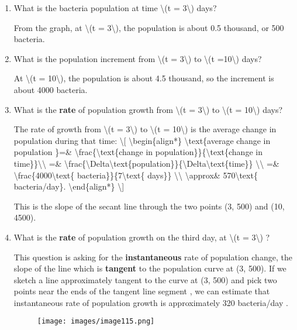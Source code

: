 \begin{enumerate}
\item
  What is the bacteria population at time \textbackslash{}(t =
  3\textbackslash{}) days?

  From the graph, at \textbackslash{}(t = 3\textbackslash{}), the
  population is about 0.5 thousand, or 500 bacteria.
\item
  What is the population increment from \textbackslash{}(t =
  3\textbackslash{}) to \textbackslash{}(t =10\textbackslash{}) days?

  At \textbackslash{}(t = 10\textbackslash{}), the population is about
  4.5 thousand, so the increment is about 4000 bacteria.
\item
  What is the \textbf{rate} of population growth from \textbackslash{}(t
  = 3\textbackslash{}) to \textbackslash{}(t = 10\textbackslash{}) days?

  The rate of growth from \textbackslash{}(t = 3\textbackslash{}) to
  \textbackslash{}(t = 10\textbackslash{}) is the average change in
  population during that time: \textbackslash{}{[}
  \textbackslash{}begin\{align*\} \textbackslash{}text\{average change
  in population \}=\& \textbackslash{}frac\{\textbackslash{}text\{change
  in population\}\}\{\textbackslash{}text\{change in
  time\}\}\textbackslash{}\textbackslash{} =\&
  \textbackslash{}frac\{\textbackslash{}Delta\textbackslash{}text\{population\}\}\{\textbackslash{}Delta\textbackslash{}text\{time\}\}
  \textbackslash{}\textbackslash{} =\&
  \textbackslash{}frac\{4000\textbackslash{}text\{
  bacteria\}\}\{7\textbackslash{}text\{ days\}\}
  \textbackslash{}\textbackslash{} \textbackslash{}approx\&
  570\textbackslash{}text\{ bacteria/day\}.
  \textbackslash{}end\{align*\} \textbackslash{}{]}

  This is the slope of the secant line through the two points (3, 500)
  and (10, 4500).
\item
  What is the \textbf{rate} of population growth on the third day, at
  \textbackslash{}(t = 3\textbackslash{}) ?

  This question is asking for the \textbf{instantaneous} rate of
  population change, the slope of the line which is \textbf{tangent} to
  the population curve at (3, 500). If we sketch a line approximately
  tangent to the curve at (3, 500) and pick two points near the ends of
  the tangent line segment , we can estimate that instantaneous rate of
  population growth is approximately 320 bacteria/day .

  \begin{figure}
  \centering
  \texttt{[image: images/image115.png]}
  \caption{}
  \end{figure}
\end{enumerate}

